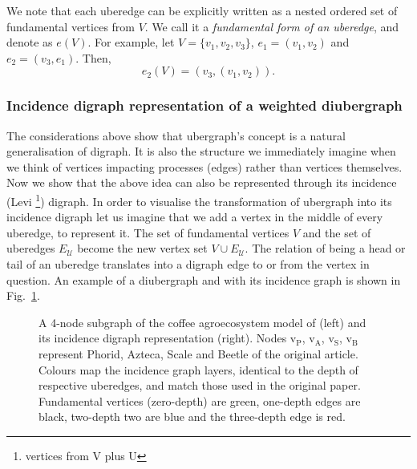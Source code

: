\documentclass[a4paper,12pt]{article}
\theoremstyle{definition}
\theoremstyle{remark}
\newcommand{\EU}{E_{\mathcal{U}}}
\newcommand{\vtx}{\text{v}}
\newcommand{\Ph}{\vtx_\text{P}}
\newcommand{\A}{\vtx_\text{A}}
\newcommand{\Sc}{\vtx_\text{S}}
\newcommand{\B}{\vtx_\text{B}}
\begin{document}
We note that each uberedge can be explicitly written as a nested ordered set of fundamental vertices from $V$. We call it a \emph{fundamental form of an uberedge}, and denote as $e(V)$. For example, let $V=\{v_1, v_2,v_3\}$, $e_1=(v_1,v_2)$ and $e_2=(v_3,e_1)$.  Then,
\begin{equation}\label{Fuedge}
    e_2(V)=(v_3, (v_1, v_2)).
\end{equation}





\subsubsection{Incidence digraph representation of a weighted diubergraph}\label{sec:inc_U_graph}

The considerations above show that ubergraph's concept is a natural generalisation of digraph. It is also the structure we immediately imagine when we think of vertices impacting processes (edges) rather than vertices themselves. Now we show that the above idea can also be represented through its incidence (Levi \footnote{vertices from V plus U}) digraph. In order to visualise the transformation of ubergraph into its incidence digraph let us imagine that we add a vertex in the middle of every uberedge, to represent it. The set of fundamental vertices $V$ and the set of uberedges $\EU$ become the new vertex set $V \cup \EU$. The relation of being a head or tail of an uberedge translates into a digraph edge to or from the vertex in question. An example of a diubergraph and with its incidence graph is shown in Fig.~\ref{fig:PASB_ubergraph_incidence_graph}.

\begin{figure}[h!]
	\begin{center}
        \caption{A 4-node subgraph of the coffee agroecosystem model of \cite{GOLUBSKI2016344} (left) and its incidence digraph representation (right). Nodes $\Ph$, $\A$, $\Sc$, $\B$ represent Phorid, Azteca, Scale and Beetle of the original article. Colours map the incidence graph layers, identical to the depth of respective uberedges, and match those used in the original paper. Fundamental vertices (zero-depth) are green, one-depth edges are black, two-depth two are blue and the three-depth edge is red.} 
    	\label{fig:PASB_ubergraph_incidence_graph}
    \end{center}
    \end{figure}
\end{document}
